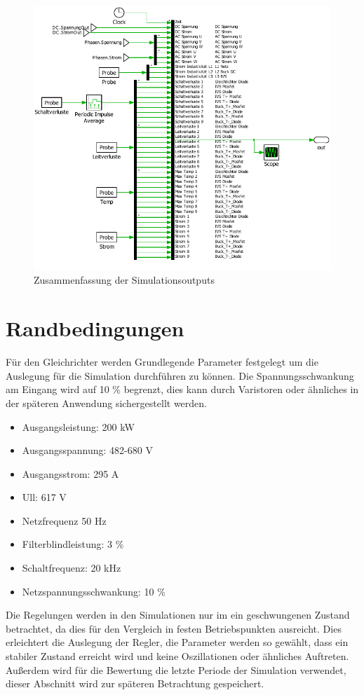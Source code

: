 \begin{figure}
\centering
\includegraphics[width=0.9\linewidth]{content/Grafiken/Plecs_Out}
\caption[Zusammenfassung der Simulationsoutputs]{Zusammenfassung der Simulationsoutputs}
\label{fig:plecsout}
\end{figure}


\section{Randbedingungen}
Für den Gleichrichter werden Grundlegende Parameter festgelegt um die Auslegung für die Simulation durchführen zu können. Die Spannungsschwankung am Eingang wird auf 10 \% begrenzt, dies kann durch Varistoren oder ähnliches in der späteren Anwendung sichergestellt werden.

\begin{itemize}
\item Ausgangsleistung: 200 kW
\item Ausgangsspannung: 482-680 V
\item Ausgangsstrom: 	295 A
\item \gls{Ull}:		617 V
\item Netzfrequenz		50 Hz
\item Filterblindleistung: 3 \%
\item Schaltfrequenz: 20 kHz
\item Netzspannungsschwankung: 10 \%
\end{itemize}

Die Regelungen werden in den Simulationen nur im ein geschwungenen Zustand betrachtet, da dies für den Vergleich in festen Betriebspunkten ausreicht. Dies erleichtert die Auslegung der Regler, die Parameter werden so gewählt, dass ein stabiler Zustand erreicht wird und keine Oszillationen oder ähnliches Auftreten. Außerdem wird für die Bewertung die letzte Periode der Simulation verwendet, dieser Abschnitt wird zur späteren Betrachtung gespeichert.

